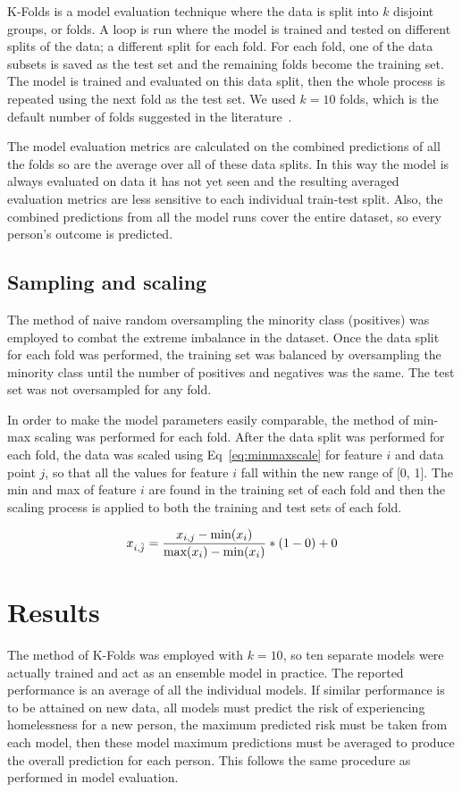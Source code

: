 \documentclass[10pt,letterpaper]{article}
\begin{document}
K-Folds is a model evaluation technique where the data is split into $k$ disjoint groups, or folds. A loop is run where the model is trained and tested on different splits of the data; a different split for each fold. For each fold, one of the data subsets is saved as the test set and the remaining folds become the training set. The model is trained and evaluated on this data split, then the whole process is repeated using the next fold as the test set. We used $k = 10$ folds, which is the default number of folds suggested in the literature~\cite{marcot2020optimal}.

The model evaluation metrics are calculated on the combined predictions of all the folds so are the average over all of these data splits. In this way the model is always evaluated on data it has not yet seen and the resulting averaged evaluation metrics are less sensitive to each individual train-test split. Also, the combined predictions from all the model runs cover the entire dataset, so every person's outcome is predicted.

\subsection*{Sampling and scaling}
The method of naive random oversampling the minority class (positives) was employed to combat the extreme imbalance in the dataset. Once the data split for each fold was performed, the training set was balanced by oversampling the minority class until the number of positives and negatives was the same. The test set was not oversampled for any fold.

In order to make the model parameters easily comparable, the method of min-max scaling was performed for each fold. After the data split was performed for each fold, the data was scaled using Eq~\ref{eq:minmaxscale} for feature $i$ and data point $j$, so that all the values for feature $i$ fall within the new range of [0, 1]. The min and max of feature $i$ are found in the training set of each fold and then the scaling process is applied to both the training and test sets of each fold.

\begin{equation}
    \centering
    x_{i, \hat{j}} = \frac{x_{i, j} - \text{min}(x_{i})}{\text{max}(x_{i}) - \text{min}(x_{i})}
    * (1 - 0) + 0
    \label{eq:minmaxscale}
\end{equation}

\section*{Results}
The method of K-Folds was employed with $k=10$, so ten separate models were actually trained and act as an ensemble model in practice. The reported performance is an average of all the individual models. If similar performance is to be attained on new data, all models must predict the risk of experiencing homelessness for a new person, the maximum predicted risk must be taken from each model, then these model maximum predictions must be averaged to produce the overall prediction for each person. This follows the same procedure as performed in model evaluation.
\end{document}
